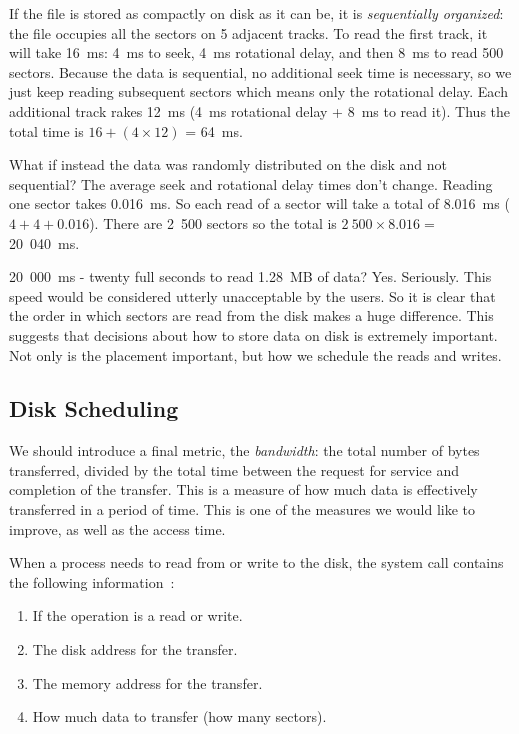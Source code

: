 If the file is stored as compactly on disk as it can be, it is \textit{sequentially organized}: the file occupies all the sectors on 5 adjacent tracks. To read the first track, it will take 16~ms: 4~ms to seek, 4~ms rotational delay, and then 8~ms to read 500 sectors. Because the data is sequential, no additional seek time is necessary, so we just keep reading subsequent sectors which means only the rotational delay. Each additional track rakes 12~ms (4~ms rotational delay + 8~ms to read it). Thus the total time is $16 + (4 \times 12)$ = 64~ms.

What if instead the data was randomly distributed on the disk and not sequential? The average seek and rotational delay times don't change. Reading one sector takes 0.016~ms. So each read of a sector will take a total of 8.016~ms ($4 + 4 + 0.016$). There are 2~500 sectors so the total is $2~500 \times 8.016 =$ 20~040~ms. 

20~000~ms - twenty full seconds to read 1.28~MB of data? Yes. Seriously. This speed would be considered utterly unacceptable by the users. So it is clear that the order in which sectors are read from the disk makes a huge difference. This suggests that decisions about how to store data on disk is extremely important. Not only is the placement important, but how we schedule the reads and writes.

\subsection*{Disk Scheduling}
We should introduce a final metric, the \textit{bandwidth}: the total number of bytes transferred, divided by the total time between the request for service and completion of the transfer. This is a measure of how much data is effectively transferred in a period of time. This is one of the measures we would like to improve, as well as the access time.

When a process needs to read from or write to the disk, the system call contains the following information~\cite{osc}:

\begin{enumerate}
	\item If the operation is a read or write.
	\item The disk address for the transfer.
	\item The memory address for the transfer.
	\item How much data to transfer (how many sectors).
\end{enumerate}

